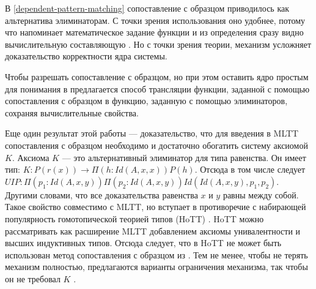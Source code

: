 В \ref{dependent-pattern-matching} сопоставление с образцом приводилось как
альтернатива элиминаторам. С точки зрения использования оно удобнее, потому
что напоминает математическое задание функции и из определения сразу видно
вычислительную составляющую \cite{dependent-pattern-matching}.
Но с точки зрения теории, механизм усложняет доказательство корректности ядра
системы.

Чтобы разрешать сопоставление с образцом, но при этом оставить ядро простым для
понимания в \cite{eliminating-dependent-pattern-matching} предлагается способ
трансляции функции, заданной с помощью сопоставления с образцом в функцию,
заданную с помощью элиминаторов, сохраняя вычислительные свойства.

Еще один результат этой работы --- доказательство, что для введения в MLTT
сопоставления с образцом необходимо и достаточно обогатить систему аксиомой
\(K\). Аксиома \(K\) --- это альтернативный элиминатор для типа равенства.
Он имеет тип: \(K : P(r(x)) \to \Pi(h : Id(A, x, x)) P(h)\). Отсюда в том
числе следует \(UIP : \Pi(p_1 : Id(A, x, y)) \Pi(p_2 : Id(A, x, y)) Id(Id(A, x, y), p_1, p_2)\).
Другими словами, что все доказательства равенства \(x\) и \(y\) равны между собой.
Такое свойство совместимо с MLTT, но вступает в противоречие с набирающей популярность
гомотопической теорией типов (HoTT) \cite{homotopy-type-theory}. HoTT можно
рассматривать как расширение MLTT добавлением аксиомы унивалентности и высших
индуктивных типов. Отсюда следует, что в HoTT не может быть использован метод
сопоставления с образцом из \cite{dependent-pattern-matching}. Тем не менее,
чтобы не терять механизм полностью, предлагаются варианты ограничения механизма,
так чтобы он не требовал \(K\) \cite{pattern-matching-without-K}.
